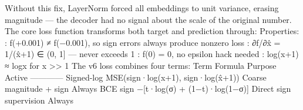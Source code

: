 {}Without this fix, LayerNorm forced all embeddings to unit variance, erasing magnitude — the decoder had no signal about the scale of the original number.\markdownRendererInterblockSeparator
{}
\markdownRendererSectionEnd \markdownRendererSectionBegin
{}\markdownRendererInterblockSeparator
{}The core loss function transforms both target and prediction through:\markdownRendererInterblockSeparator
{}\markdownRendererInterblockSeparator
{}Properties:\markdownRendererInterblockSeparator
{}\markdownRendererUlBeginTight
\markdownRendererUlItem {}: f(+0.001) ≠ f(−0.001), so sign errors always produce nonzero loss\markdownRendererUlItemEnd 
\markdownRendererUlItem {}: ∂f/∂x̂ = 1/(\markdownRendererPipe{}x̂\markdownRendererPipe{}+1) ∈ (0, 1] — never exceeds 1\markdownRendererUlItemEnd 
\markdownRendererUlItem {}: f(0) = 0, no epsilon hack needed\markdownRendererUlItemEnd 
\markdownRendererUlItem {}: log(\markdownRendererPipe{}x\markdownRendererPipe{}+1) ≈ log\markdownRendererPipe{}x\markdownRendererPipe{} for \markdownRendererPipe{}x\markdownRendererPipe{} >> 1\markdownRendererUlItemEnd 
\markdownRendererUlEndTight \markdownRendererInterblockSeparator
{}
\markdownRendererSectionEnd \markdownRendererSectionBegin
{}\markdownRendererInterblockSeparator
{}The v6 loss combines four terms:\markdownRendererInterblockSeparator
{}\markdownRendererInterblockSeparator
{}\markdownRendererPipe{} Term \markdownRendererPipe{} Formula \markdownRendererPipe{} Purpose \markdownRendererPipe{} Active \markdownRendererPipe{}\markdownRendererSoftLineBreak
{}\markdownRendererPipe{}---\markdownRendererPipe{}---\markdownRendererPipe{}---\markdownRendererPipe{}---\markdownRendererPipe{}\markdownRendererSoftLineBreak
{}\markdownRendererPipe{} Signed-log \markdownRendererPipe{} MSE(sign·log(\markdownRendererPipe{}x\markdownRendererPipe{}+1), sign·log(\markdownRendererPipe{}x̂\markdownRendererPipe{}+1)) \markdownRendererPipe{} Coarse magnitude + sign \markdownRendererPipe{} Always \markdownRendererPipe{}\markdownRendererSoftLineBreak
{}\markdownRendererPipe{} BCE sign \markdownRendererPipe{} −[t·log(σ) + (1−t)·log(1−σ)] \markdownRendererPipe{} Direct sign supervision \markdownRendererPipe{} Always \markdownRendererPipe{}\markdownRendererSoftLineBreak

